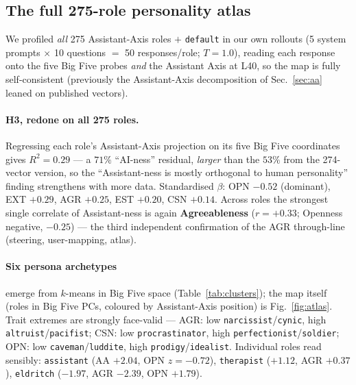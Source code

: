 \documentclass[11pt]{article}
\begin{document}
\subsection{The full 275-role personality atlas}
\label{sec:atlas}
We profiled \emph{all} 275 Assistant-Axis roles $+$ \texttt{default} in our own
rollouts (5 system prompts $\times$ 10 questions $=$ 50 responses/role;
$T{=}1.0$), reading each response onto the five Big Five probes \emph{and} the
Assistant Axis at L40, so the map is fully self-consistent (previously the
Assistant-Axis decomposition of Sec.~\ref{sec:aa} leaned on published vectors).

\paragraph{H3, redone on all 275 roles.} Regressing each role's Assistant-Axis
projection on its five Big Five coordinates gives \textbf{$R^2=0.29$} --- a
$71\%$ ``AI-ness'' residual, \emph{larger} than the $53\%$ from the 274-vector
version, so the ``Assistant-ness is mostly orthogonal to human personality''
finding strengthens with more data. Standardised $\beta$: OPN $-0.52$ (dominant),
EXT $+0.29$, AGR $+0.25$, EST $+0.20$, CSN $+0.14$. Across roles the strongest
single correlate of Assistant-ness is again \textbf{Agreeableness} ($r{=}{+}0.33$;
Openness negative, $-0.25$) --- the third independent confirmation of the AGR
through-line (steering, user-mapping, atlas).

\paragraph{Six persona archetypes} emerge from $k$-means in Big Five space
(Table~\ref{tab:clusters}); the map itself (roles in Big Five PCs, coloured by
Assistant-Axis position) is Fig.~\ref{fig:atlas}. Trait extremes are strongly
face-valid --- AGR: low \texttt{narcissist}/\texttt{cynic}, high
\texttt{altruist}/\texttt{pacifist}; CSN: low \texttt{procrastinator}, high
\texttt{perfectionist}/\texttt{soldier}; OPN: low \texttt{caveman}/\texttt{luddite},
high \texttt{prodigy}/\texttt{idealist}. Individual roles read sensibly:
\texttt{assistant} (AA $+2.04$, OPN $z{=}{-}0.72$), \texttt{therapist} ($+1.12$,
AGR $+0.37$), \texttt{eldritch} ($-1.97$, AGR $-2.39$, OPN $+1.79$).
\end{document}
